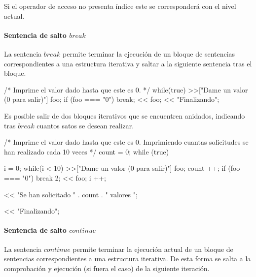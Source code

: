 
Si el operador de acceso no presenta índice este se corresponderá con el nivel actual.



\paragraph{Sentencia de salto $break$} \label{sec:stmt_break}
La sentencia $break$ permite terminar la ejecución de un bloque de sentencias correspondientes a una estructura iterativa y saltar a la siguiente sentencia tras el bloque. \\

\begin{myverbatim}
   /*
      Imprime el valor dado
      hasta que este es 0.
   */
  while(true){
    >>["Dame un valor (0 para salir)"] foo;
    if (foo === "0")
      break;
    << foo;
  }
  << "Finalizando";
\end{myverbatim}

Es posible salir de dos bloques iterativos que se encuentren anidados, indicando tras $break$ cuantos satos se desean realizar. \\

\begin{myverbatim}
   /*
      Imprime el valor dado
      hasta que este es 0.
      Imprimiendo cuantas 
      solicitudes se han 
      realizado cada 10 veces
   */
   count = 0;
   while (true) {
     i = 0;
     while(i < 10){
       >>["Dame un valor (0 para salir)"] foo;
       count ++;
       if (foo === "0")
         break 2;
       << foo;
       i ++;
     }
     
     << "Se han solicitado " . count . " valores ";
   }
  << "Finalizando";
\end{myverbatim} 

\paragraph{Sentencia de salto $continue$} \label{sec:stmt_continue}

La sentencia $continue$ permite terminar la ejecución actual de un bloque de sentencias correspondientes a una estructura iterativa. De esta forma se salta a la comprobación y 
ejecución (si fuera el caso) de la siguiente iteración. \\

